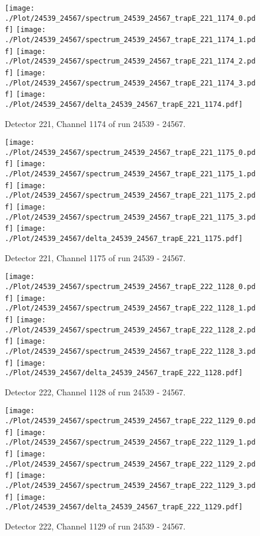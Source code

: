 \clearpage
\begin{figure}[hb]
\centering
\texttt{[image: ./Plot/24539\_24567/spectrum\_24539\_24567\_trapE\_221\_1174\_0.pdf]}
\texttt{[image: ./Plot/24539\_24567/spectrum\_24539\_24567\_trapE\_221\_1174\_1.pdf]}
\texttt{[image: ./Plot/24539\_24567/spectrum\_24539\_24567\_trapE\_221\_1174\_2.pdf]}
\texttt{[image: ./Plot/24539\_24567/spectrum\_24539\_24567\_trapE\_221\_1174\_3.pdf]}
\texttt{[image: ./Plot/24539\_24567/delta\_24539\_24567\_trapE\_221\_1174.pdf]}
\caption{ Detector 221, Channel 1174 of run 24539 - 24567.}
\label{fig:24539_24567_trapE_221_1174}
\end{figure}
\clearpage
\begin{figure}[hb]
\centering
\texttt{[image: ./Plot/24539\_24567/spectrum\_24539\_24567\_trapE\_221\_1175\_0.pdf]}
\texttt{[image: ./Plot/24539\_24567/spectrum\_24539\_24567\_trapE\_221\_1175\_1.pdf]}
\texttt{[image: ./Plot/24539\_24567/spectrum\_24539\_24567\_trapE\_221\_1175\_2.pdf]}
\texttt{[image: ./Plot/24539\_24567/spectrum\_24539\_24567\_trapE\_221\_1175\_3.pdf]}
\texttt{[image: ./Plot/24539\_24567/delta\_24539\_24567\_trapE\_221\_1175.pdf]}
\caption{ Detector 221, Channel 1175 of run 24539 - 24567.}
\label{fig:24539_24567_trapE_221_1175}
\end{figure}
\clearpage
\begin{figure}[hb]
\centering
\texttt{[image: ./Plot/24539\_24567/spectrum\_24539\_24567\_trapE\_222\_1128\_0.pdf]}
\texttt{[image: ./Plot/24539\_24567/spectrum\_24539\_24567\_trapE\_222\_1128\_1.pdf]}
\texttt{[image: ./Plot/24539\_24567/spectrum\_24539\_24567\_trapE\_222\_1128\_2.pdf]}
\texttt{[image: ./Plot/24539\_24567/spectrum\_24539\_24567\_trapE\_222\_1128\_3.pdf]}
\texttt{[image: ./Plot/24539\_24567/delta\_24539\_24567\_trapE\_222\_1128.pdf]}
\caption{ Detector 222, Channel 1128 of run 24539 - 24567.}
\label{fig:24539_24567_trapE_222_1128}
\end{figure}
\clearpage
\begin{figure}[hb]
\centering
\texttt{[image: ./Plot/24539\_24567/spectrum\_24539\_24567\_trapE\_222\_1129\_0.pdf]}
\texttt{[image: ./Plot/24539\_24567/spectrum\_24539\_24567\_trapE\_222\_1129\_1.pdf]}
\texttt{[image: ./Plot/24539\_24567/spectrum\_24539\_24567\_trapE\_222\_1129\_2.pdf]}
\texttt{[image: ./Plot/24539\_24567/spectrum\_24539\_24567\_trapE\_222\_1129\_3.pdf]}
\texttt{[image: ./Plot/24539\_24567/delta\_24539\_24567\_trapE\_222\_1129.pdf]}
\caption{ Detector 222, Channel 1129 of run 24539 - 24567.}
\label{fig:24539_24567_trapE_222_1129}
\end{figure}
